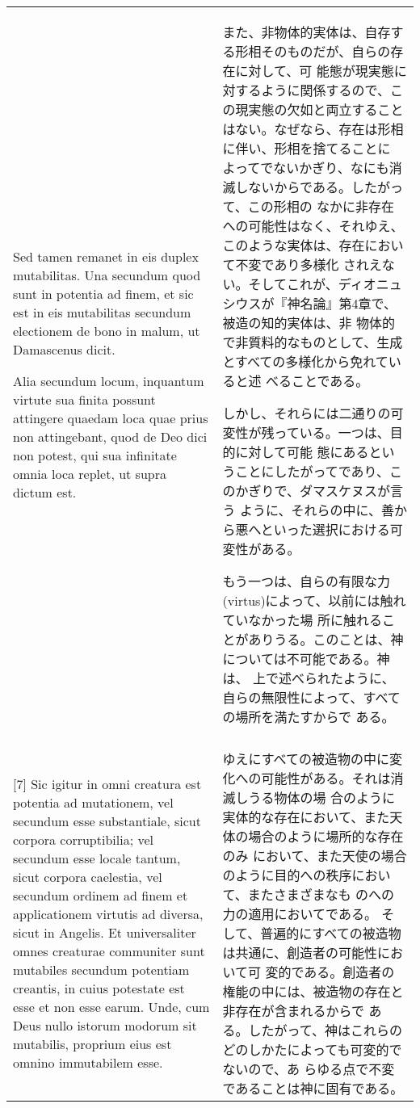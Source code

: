 \documentclass[10pt]{jsarticle} %
\begin{document}
\begin{longtable}{p{21em}p{21em}}
Sed tamen remanet in eis duplex mutabilitas. Una secundum quod sunt in
potentia ad finem, et sic est in eis mutabilitas secundum electionem
de bono in malum, ut Damascenus dicit.

Alia secundum locum, inquantum virtute sua finita possunt attingere
quaedam loca quae prius non attingebant, quod de Deo dici non potest,
qui sua infinitate omnia loca replet, ut supra dictum est.

&

また、非物体的実体は、自存する形相そのものだが、自らの存在に対して、可
能態が現実態に対するように関係するので、この現実態の欠如と両立すること
はない。なぜなら、存在は形相に伴い、形相を捨てることに
よってでないかぎり、なにも消滅しないからである。したがって、この形相の
 なかに非存在への可能性はなく、それゆえ、このような実体は、存在において不変であり多様化
されえない。そしてこれが、ディオニュシウスが『神名論』第4章で、被造の知的実体は、非
物体的で非質料的なものとして、生成とすべての多様化から免れていると述
べることである。

しかし、それらには二通りの可変性が残っている。一つは、目的に対して可能
態にあるということにしたがってであり、このかぎりで、ダマスケヌスが言う
ように、それらの中に、善から悪へといった選択における可変性がある。

もう一つは、自らの有限な力(virtus)によって、以前には触れていなかった場
所に触れることがありうる。このことは、神については不可能である。神は、
上で述べられたように、自らの無限性によって、すべての場所を満たすからで
ある。

\\


\\

[7] Sic igitur in omni creatura est potentia ad mutationem, vel secundum
esse substantiale, sicut corpora corruptibilia; vel secundum esse
locale tantum, sicut corpora caelestia, vel secundum ordinem ad finem
et applicationem virtutis ad diversa, sicut in Angelis.
Et universaliter omnes creaturae communiter sunt mutabiles secundum
potentiam creantis, in cuius potestate est esse et non esse
earum. Unde, cum Deus nullo istorum modorum sit mutabilis, proprium
eius est omnino immutabilem esse.
&


ゆえにすべての被造物の中に変化への可能性がある。それは消滅しうる物体の場
合のように実体的な存在において、また天体の場合のように場所的な存在のみ
において、また天使の場合のように目的への秩序において、またさまざまなも
のへの力の適用においてである。
そして、普遍的にすべての被造物は共通に、創造者の可能性において可
変的である。創造者の権能の中には、被造物の存在と非存在が含まれるからで
ある。したがって、神はこれらのどのしかたによっても可変的でないので、あ
らゆる点で不変であることは神に固有である。


\end{longtable}
\end{document}
